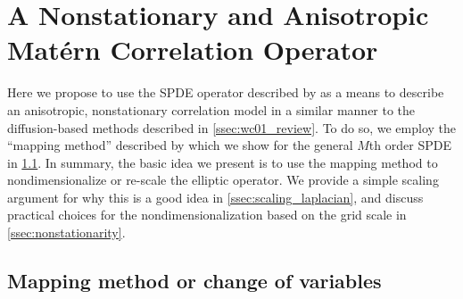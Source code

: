 \section{A Nonstationary and Anisotropic Mat\'ern Correlation Operator}
\label{sec:matern_operator}

Here we propose to use the SPDE operator described by 
as a means to describe an anisotropic, nonstationary correlation model in a
similar manner to the diffusion-based methods described in
\cref{ssec:wc01_review}.
To do so, we employ the ``mapping method'' described by 
which we show for the general $M$th order SPDE in \cref{ssec:mapping_method}.
In summary, the basic idea we present is to use the mapping method to
nondimensionalize or re-scale the elliptic operator.
We provide a simple scaling argument for why this is a good idea in
\cref{ssec:scaling_laplacian}, and discuss practical choices for the
nondimensionalization based on the grid scale in \cref{ssec:nonstationarity}.

\subsection{Mapping method or change of variables}
\label{ssec:mapping_method}

